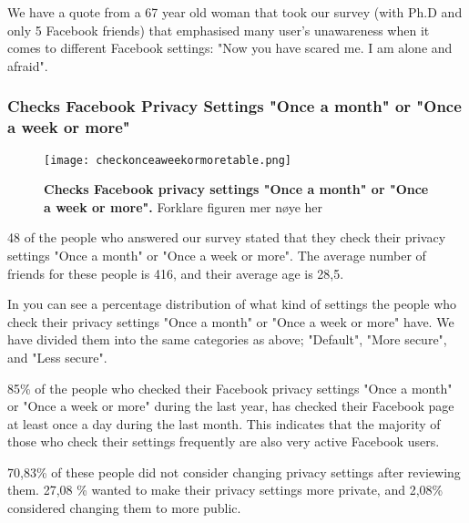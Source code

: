 We have a quote from a 67 year old woman that took our survey (with Ph.D and only 5 Facebook friends) that emphasised many user's unawareness when it comes to different Facebook settings: "Now you have scared me. I am alone and afraid".


\subsubsection{Checks Facebook Privacy Settings "Once a month" or "Once a week or more"}

\begin{figure}[h!]
\centering
\texttt{[image: checkonceaweekormoretable.png]}
\caption[Checks Facebook privacy settings "Once a month" or "Once a week or more"]{\textbf{Checks Facebook privacy settings "Once a month" or "Once a week or more".} Forklare figuren mer nøye her} 
\label{fig:onceaweekormore}
\end{figure}

48 of the people who answered our survey stated that they check their privacy settings "Once a month" or "Once a week or more". The average number of friends for these people is 416, and their average age is 28,5. 

In  you can see a percentage distribution of what kind of settings the people who check their privacy settings "Once a month" or "Once a week or more" have. We have divided them into the same categories as above; "Default", "More secure", and "Less secure".  

85\% of the people who checked their Facebook privacy settings "Once a month" or "Once a week or more" during the last year, has checked their Facebook page at least once a day during the last month. This indicates that the majority of those who check their settings frequently are also very active Facebook users. 

70,83\% of these people did not consider changing privacy settings after reviewing them. 27,08 \% wanted to make their privacy settings more private, and 2,08\% considered changing them to more public. 




